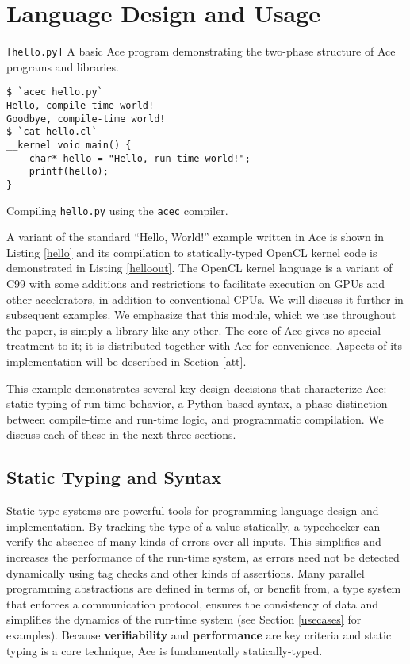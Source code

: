 \documentclass[9pt,preprint]{sigplanconf}
\begin{document}
\section{Language Design and Usage}\label{usage}
\begin{codelisting}

\caption{\texttt{[hello.py]} A basic Ace program demonstrating the two-phase structure of Ace programs and libraries.}
\label{hello}
\end{codelisting}
\begin{codelisting}
\begin{lstlisting}[style=Bash]
$ `acec hello.py`
Hello, compile-time world!
Goodbye, compile-time world!
$ `cat hello.cl`
__kernel void main() {
    char* hello = "Hello, run-time world!";
    printf(hello);
}\end{lstlisting}
\caption{Compiling \texttt{hello.py} using the \texttt{acec} compiler.}
\label{helloout}
\end{codelisting}
A variant of the standard ``Hello, World!'' example written in Ace is shown in Listing \ref{hello} and its compilation to statically-typed OpenCL kernel code is demonstrated in Listing \ref{helloout}. The OpenCL kernel language is a variant of C99 with some additions and restrictions to facilitate execution on GPUs and other accelerators, in addition to conventional CPUs. We will discuss it further in subsequent examples.
We emphasize that this module, which we use throughout the paper, is simply a library like any other. The core of Ace gives no special treatment to it; it is distributed together with Ace for convenience. Aspects of its implementation will be described  in Section \ref{att}.

This example demonstrates several key design decisions that characterize Ace: static typing of run-time behavior, a Python-based syntax, a phase distinction between compile-time and run-time logic, and programmatic compilation. We discuss each of these in the next three sections. 
\subsection{Static Typing and Syntax}
Static type systems are powerful tools for programming language design and implementation. By tracking the type of a value statically, a typechecker can verify the absence of many kinds of errors over all inputs. This simplifies and increases the performance of the run-time system, as errors need not be detected dynamically using tag checks and other kinds of assertions. Many parallel programming abstractions are defined in terms of, or benefit from, a type system that enforces a communication protocol, ensures the consistency of data and simplifies the dynamics of the run-time system (see Section \ref{usecases} for examples). Because \textbf{verifiability} and \textbf{performance} are key criteria and static typing is a core technique, Ace is fundamentally statically-typed.
\end{document}
